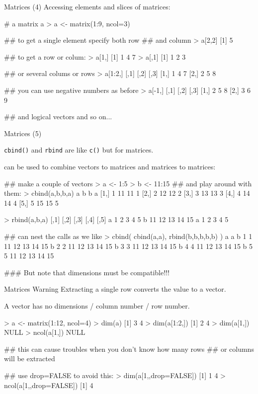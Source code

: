 \documentclass[pdf]{beamer}
\begin{document}
\begin{frame}[fragile]{Matrices (4)}
  Accessing elements and slices of matrices:

  \begin{rcode}
    # a matrix a
    > a <- matrix(1:9, ncol=3)

    ## to get a single element specify both row
    ## and column
    > a[2,2]
    [1] 5
    
    ## to get a row or colum:
    > a[1,]
    [1] 1 4 7
    > a[,1]
    [1] 1 2 3

    ## or several colums or rows
    > a[1:2,]
         [,1] [,2] [,3]
    [1,]    1    4    7
    [2,]    2    5    8

    ## you can use negative numbers as before
    > a[-1,]
         [,1] [,2] [,3]
    [1,]    2    5    8
    [2,]    3    6    9
    
    ## and logical vectors and so on...
  \end{rcode}
\end{frame}

\begin{frame}[fragile]{Matrices (5)}

  {\small
  \texttt{cbind()} and \texttt{rbind} are like \texttt{c()} but for matrices.
  
  can be used to combine vectors to matrices and matrices
  to matrices:
}
  \begin{rcode}
    ## make a couple of vectors
    > a <- 1:5
    > b <- 11:15
    ## and play around with them:
    > cbind(a,b,b,a)
         a  b  b a
    [1,] 1 11 11 1
    [2,] 2 12 12 2
    [3,] 3 13 13 3
    [4,] 4 14 14 4
    [5,] 5 15 15 5

    > rbind(a,b,a)
      [,1] [,2] [,3] [,4] [,5]
    a    1    2    3    4    5
    b   11   12   13   14   15
    a    1    2    3    4    5

    ## can nest the calls as we like
    > cbind( cbind(a,a), rbind(b,b,b,b,b) )
      a a               
    b 1 1 11 12 13 14 15
    b 2 2 11 12 13 14 15
    b 3 3 11 12 13 14 15
    b 4 4 11 12 13 14 15
    b 5 5 11 12 13 14 15
    
    ### But note that dimensions must be compatible!!!
  \end{rcode}
\end{frame}

\begin{frame}[fragile]{Matrices Warning}
  Extracting a single row converts the value to a vector.
  
  A vector has no dimensions / column number / row number.
  \begin{rcode}
    > a <- matrix(1:12, ncol=4)
    > dim(a)
    [1] 3 4
    > dim(a[1:2,])
    [1] 2 4
    > dim(a[1,])
    NULL
    > ncol(a[1,])
    NULL
    
    ## this can cause troubles when you don't know how many rows
    ## or columns will be extracted

    ## use drop=FALSE to avoid this:
    > dim(a[1,,drop=FALSE])
    [1] 1 4
    > ncol(a[1,,drop=FALSE])
    [1] 4
  \end{rcode}
\end{frame}
\end{document}

